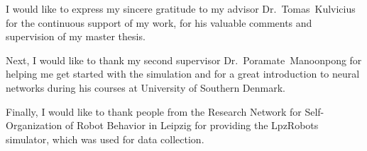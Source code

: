 
\begin{acknowledgements}

I would like to express my sincere gratitude to my advisor Dr.~\mbox{Tomas}~\mbox{Kulvicius} for the continuous support of my work, for his valuable comments and \mbox{supervision} of my master thesis.

Next, I would like to thank my second supervisor Dr.~\mbox{Poramate}~\mbox{Manoonpong} for helping me get started with the simulation and for a great introduction to neural networks during his courses at University of Southern Denmark.

Finally, I would like to thank people from the Research Network for Self-Organization of Robot Behavior in Leipzig for providing the LpzRobots \mbox{simulator}, which was used for data collection.

\end{acknowledgements}